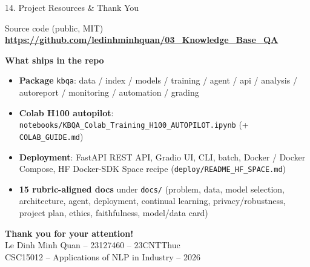 \documentclass[10pt,aspectratio=169]{beamer}
\begin{document}
\begin{frame}{14. Project Resources \& Thank You}
\begin{block}{Source code (public, MIT)}
\centering
\large \textbf{\url{https://github.com/ledinhminhquan/03_Knowledge_Base_QA}}
\end{block}

\textbf{What ships in the repo}
\begin{itemize}\scriptsize
  \item \textbf{Package} \texttt{kbqa}: data / index / models / training / agent / api / analysis / autoreport / monitoring / automation / grading
  \item \textbf{Colab H100 autopilot}: \texttt{notebooks/KBQA\_Colab\_Training\_H100\_AUTOPILOT.ipynb} (+ \texttt{COLAB\_GUIDE.md})
  \item \textbf{Deployment}: FastAPI REST API, Gradio UI, CLI, batch, Docker / Docker Compose, HF Docker-SDK Space recipe (\texttt{deploy/README\_HF\_SPACE.md})
  \item \textbf{15 rubric-aligned docs} under \texttt{docs/} (problem, data, model selection, architecture, agent, deployment, continual learning, privacy/robustness, project plan, ethics, faithfulness, model/data card)
\end{itemize}

\vspace{0.3cm}
\centering
\Large\textbf{Thank you for your attention!}\\[0.2cm]
\normalsize Le Dinh Minh Quan -- 23127460 -- 23CNTThuc \\
\small CSC15012 -- Applications of NLP in Industry -- 2026
\end{frame}
\end{document}
